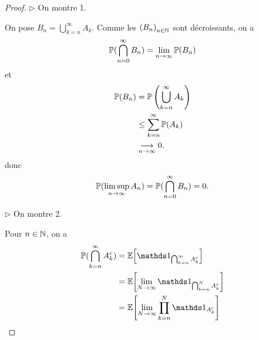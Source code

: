 \begin{proof}
    \(\triangleright\) On montre 1.

    On pose \(B_n = \bigcup_{k=n}^\infty A_k\). Comme
    les \({(B_n)}_{n\in\mathbb{N}}\) sont décroissants, on a
    \begin{equation*}
        \mathbb{P}(\bigcap_{n=0}^\infty B_n)
        = \lim_{n\to\infty} \mathbb{P}(B_n)
    \end{equation*}
    et
    \begin{equation*}
        \begin{aligned}
            \mathbb{P}(B_n)
            &= \mathbb{P}\left( \bigcup_{k=n}^\infty A_k \right)\\
            &\leq \sum_{k=n}^\infty \mathbb{P}(A_k)\\
            &\underset{n\to\infty}{\longrightarrow} 0.
        \end{aligned}
    \end{equation*}
    donc
    \begin{equation*}
        \mathbb{P}(\limsup_{n\to\infty} A_n) = \mathbb{P}(\bigcap_{n=0}^\infty B_n) = 0.
    \end{equation*}

    \(\triangleright\) On montre 2.

    Pour \(n\in\mathbb{N}\), on a
    \begin{equation*}
        \begin{aligned}
            \bb P(\bigcap_{k=n}^\infty A_k^c)
            &= \bb E\ff{\one_{\bigcap_{k=n}^\infty A_k^c}}\\
            &= \bb E\ff{\lim_{N\to\infty} \one_{\bigcap_{k=n}^N A_k^c}}\\
            &= \bb E\ff{\lim_{N\to\infty} \prod_{k=n}^N \one_{A_k^c}}\\
        \end{aligned}
    \end{equation*}


\end{proof}
